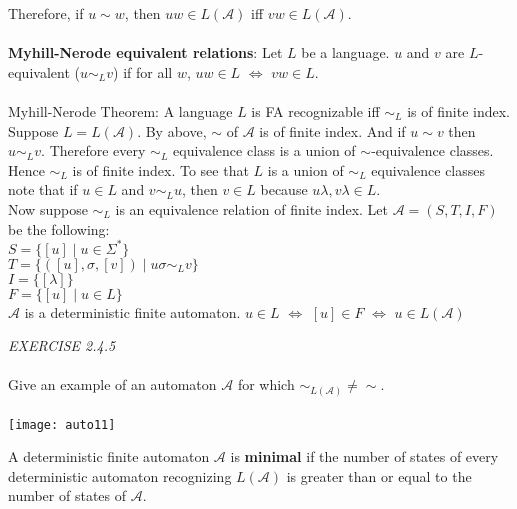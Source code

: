 \documentclass{article}
\begin{document}
Therefore, if \(u\sim w\), then \(uw\in L(\mathcal{A})\) iff \(vw\in L(\mathcal{A})\).\\\\
\textbf{Myhill-Nerode equivalent relations}: Let \(L\) be a language. \(u\) and \(v\) are \(L\)-equivalent (\(u\sim_{L} v\)) if for all \(w\), \(uw\in L\) \(\Longleftrightarrow\) \(vw\in L\).\\\\
\color{red}Myhill-Nerode Theorem: A language \(L\) is FA recognizable iff \(\sim_{L}\) is of finite index.\color{black}\\
Suppose \(L=L(\mathcal{A})\). By above, \(\sim\) of \(\mathcal{A}\) is of finite index. And if \(u\sim v\) then \(u\sim_{L} v\). Therefore every \(\sim_{L}\) equivalence class is a union of \(\sim\)-equivalence classes. 
Hence \(\sim_{L}\) is of finite index. To see that \(L\) is a union of \(\sim_{L}\) equivalence classes note that if \(u\in L\) and \(v\sim_{L} u\), then \(v\in L\) because \(u\lambda, v\lambda\in L\).\\
Now suppose \(\sim_{L}\) is an equivalence relation of finite index. Let \(\mathcal{A}=(S,T,I,F)\) be the following:\\
\null\qquad \(S=\{[u]\;|\;u\in\Sigma^{*}\}\)\\
\null\qquad \(T=\{([u],\sigma,[v])\;|\;u\sigma\sim_{L}v\}\)\\
\null\qquad \(I=\{[\lambda]\}\)\\
\null\qquad \(F=\{[u]\;|\;u\in L\}\)\\
\(\mathcal{A}\) is a deterministic finite automaton. \(u\in L\) \(\Longleftrightarrow\) \([u]\in F\) \(\Longleftrightarrow\) \(u\in L(\mathcal{A})\)\\
\begin{siderules}\color{blue}\textit{EXERCISE 2.4.5}\color{black}\\\\
\color{blue}Give an example of an automaton \(\mathcal{A}\) for which \(\sim_{L(\mathcal{A})}\neq\sim\).\\\\
\texttt{[image: auto11]}
\end{siderules}
A deterministic finite automaton \(\mathcal{A}\) is \textbf{minimal} if the number of states of every deterministic automaton recognizing \(L(\mathcal{A})\) is greater than or equal to the number of states of \(\mathcal{A}\).\\
\end{document}
